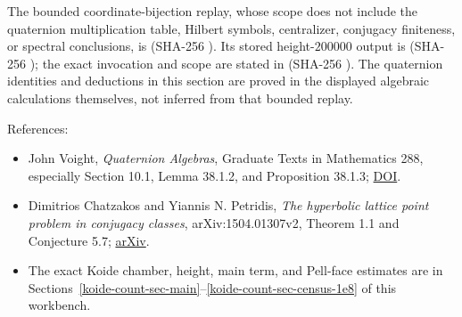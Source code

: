The bounded coordinate-bijection replay, whose scope does not include the
quaternion multiplication table, Hilbert symbols, centralizer, conjugacy
finiteness, or spectral conclusions, is
(SHA-256
).
Its stored height-\(200000\) output is
(SHA-256
);
the exact invocation and scope are stated in
(SHA-256
).
The quaternion identities and deductions in this section are proved in the
displayed algebraic calculations themselves, not inferred from that bounded
replay.

References:

\begin{itemize}
\item
  John Voight, \emph{Quaternion Algebras}, Graduate Texts in Mathematics 288,
  especially Section 10.1, Lemma 38.1.2, and Proposition 38.1.3;
  \href{https://doi.org/10.1007/978-3-030-56694-4}{DOI}.
\item
  Dimitrios Chatzakos and Yiannis N. Petridis,
  \emph{The hyperbolic lattice point problem in conjugacy classes},
  arXiv:1504.01307v2, Theorem 1.1 and Conjecture 5.7;
  \href{https://arxiv.org/abs/1504.01307}{arXiv}.
\item
  The exact Koide chamber, height, main term, and Pell-face estimates are in
  Sections~\ref{koide-count-sec-main}--\ref{koide-count-sec-census-1e8}
  of this workbench.
\end{itemize}
